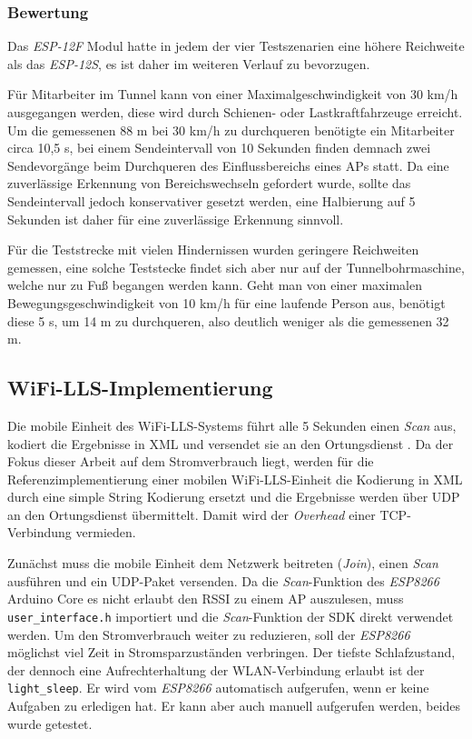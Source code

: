 \subsubsection{Bewertung}
\label{ch:Reichweite:sec:bewertung}
Das \emph{ESP-12F} Modul hatte in jedem der vier Testszenarien eine höhere Reichweite als das \emph{ESP-12S}, es ist daher im weiteren Verlauf zu bevorzugen.

Für Mitarbeiter im Tunnel kann von einer Maximalgeschwindigkeit von 30 km/h ausgegangen werden, diese wird durch Schienen- oder Lastkraftfahrzeuge erreicht. 
Um die gemessenen 88 m bei 30 km/h zu durchqueren benötigte ein Mitarbeiter circa 10,5 s, bei einem Sendeintervall von 10 Sekunden finden demnach zwei Sendevorgänge beim Durchqueren des Einflussbereichs eines APs statt.
Da eine zuverlässige Erkennung von Bereichswechseln gefordert wurde, sollte das Sendeintervall jedoch konservativer gesetzt werden, eine Halbierung auf 5 Sekunden ist daher für eine zuverlässige Erkennung sinnvoll.

Für die Teststrecke mit vielen Hindernissen wurden geringere Reichweiten gemessen, eine solche Teststecke findet sich aber nur auf der Tunnelbohrmaschine, welche nur zu Fuß begangen werden kann. 
Geht man von einer maximalen Bewegungsgeschwindigkeit von 10 km/h für eine laufende Person aus, benötigt diese 5 s, um 14 m zu durchqueren, also deutlich weniger als die gemessenen 32 m.





\subsection{WiFi-LLS-Implementierung}
\label{ch:phase1:sec:wifills}
Die mobile Einheit des WiFi-LLS-Systems führt alle 5 Sekunden einen \emph{Scan} aus, kodiert die Ergebnisse in XML und versendet sie an den Ortungsdienst \cite{chen2007design}.
Da der Fokus dieser Arbeit auf dem Stromverbrauch liegt, werden für die Referenzimplementierung einer mobilen WiFi-LLS-Einheit die Kodierung in XML durch eine simple String Kodierung ersetzt und die Ergebnisse werden über UDP an den Ortungsdienst übermittelt. 
Damit wird der \emph{Overhead} einer TCP-Verbindung vermieden.

Zunächst muss die mobile Einheit dem Netzwerk beitreten (\emph{Join}), einen \emph{Scan} ausführen und ein UDP-Paket versenden.
Da die \emph{Scan}-Funktion des \emph{ESP8266} Arduino Core es nicht erlaubt den RSSI zu einem AP auszulesen, muss \texttt{user\_interface.h} importiert und die \emph{Scan}-Funktion der SDK direkt verwendet werden.
Um den Stromverbrauch weiter zu reduzieren, soll der \emph{ESP8266} möglichst viel Zeit in Stromsparzuständen verbringen.
Der tiefste Schlafzustand, der dennoch eine Aufrechterhaltung der WLAN-Verbindung erlaubt ist der \texttt{light\_sleep}. 
Er wird vom \emph{ESP8266} automatisch aufgerufen, wenn er keine Aufgaben zu erledigen hat.
Er kann aber auch manuell aufgerufen werden, beides wurde getestet.

